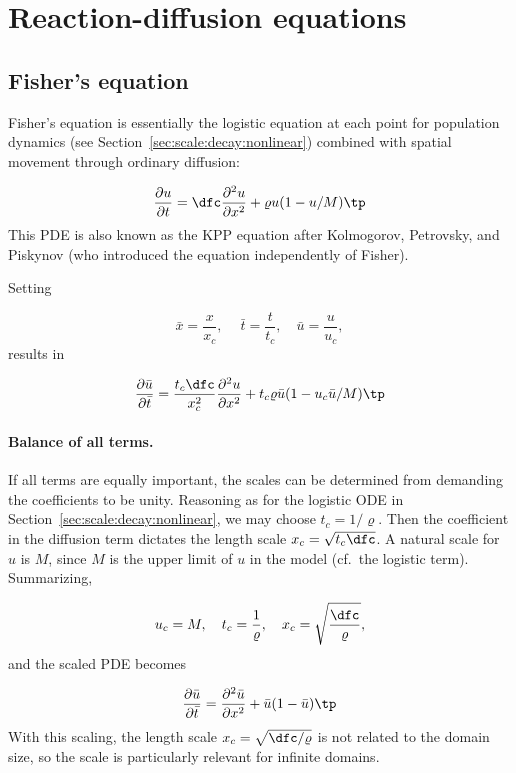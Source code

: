 \documentclass[graybox,envcountchap,sectrefs,final]{svmonodo}
\begin{document}
\section{Reaction-diffusion equations}
\label{sec:scale:diffu:Fisher}

\subsection{Fisher's equation}

Fisher's equation is essentially the logistic equation at each point
for population dynamics (see Section~\ref{sec:scale:decay:nonlinear})
combined with spatial movement through ordinary diffusion:

\begin{equation}
\frac{\partial u}{\partial t} =
\dfc\frac{\partial^2 u}{\partial x^2} + \varrho u(1-u/M)
\tp
\label{sec:scale:diffu:Fisher:pde}
\end{equation}
This PDE is also known as the KPP equation after
Kolmogorov, Petrovsky, and Piskynov (who introduced the equation
independently of Fisher).

Setting

\[ \bar x = \frac{x}{x_c},\quad
\ \bar t = \frac{t}{t_c}, \quad\bar u =\frac{u}{u_c},\]
results in

\[
\frac{\partial \bar u}{\partial \bar t} =
\frac{t_c\dfc}{x_c^2}
\frac{\partial^2 u}{\partial x^2} + t_c \varrho \bar u (1 - u_c\bar u/M)\tp
\]

\paragraph{Balance of all terms.}
If all terms are equally important, the scales can be determined from
demanding the coefficients to be unity.
Reasoning as for the logistic ODE in Section~\ref{sec:scale:decay:nonlinear},
we may choose $t_c=1/\varrho$. Then
the coefficient in the diffusion term dictates the length scale $x_c =
\sqrt{t_c\dfc}$.
A natural scale for $u$ is $M$, since $M$ is the upper limit of $u$ in
the model (cf.~the logistic term). Summarizing,

\[ u_c=M,\quad t_c = \frac{1}{\varrho},\quad x_c = \sqrt{\frac{\dfc}{\varrho}},
\]
and the scaled PDE becomes

\begin{equation}
\frac{\partial \bar u}{\partial \bar t} =
\frac{\partial^2 \bar u}{\partial x^2} + \bar u (1 - \bar u)\tp
\end{equation}
With this scaling, the length scale $x_c=\sqrt{\dfc/\varrho}$
is not related to the domain size, so the scale is particularly relevant for
infinite domains.
\end{document}
